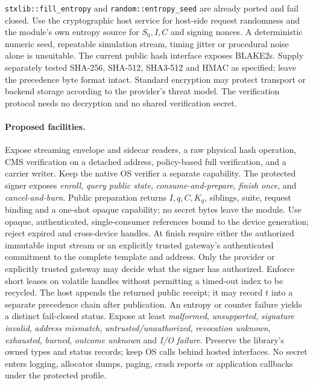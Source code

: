 \documentclass[10pt,twocolumn,letterpaper]{article}
\begin{document}
\texttt{stxlib::fill\_entropy} and \texttt{random::entropy\_seed} are already ported and fail closed. Use the cryptographic host service for host-side request randomness and the module's own entropy source for $S_0,I,C$ and signing nonces. A deterministic numeric seed, repeatable simulation stream, timing jitter or procedural noise alone is unsuitable. The current public hash interface exposes BLAKE2s. Supply separately tested SHA-256, SHA-512, SHA3-512 and HMAC as specified; leave the precedence byte format intact. Standard encryption may protect transport or backend storage according to the provider's threat model. The verification protocol needs no decryption and no shared verification secret.

\paragraph{Proposed facilities.}
Expose streaming envelope and sidecar readers, a raw physical hash operation, CMS verification on a detached address, policy-based full verification, and a carrier writer. Keep the native OS verifier a separate capability. The protected signer exposes \emph{enroll}, \emph{query public state}, \emph{consume-and-prepare}, \emph{finish once}, and \emph{cancel-and-burn}. Public preparation returns $I,q,C,K_q$, siblings, suite, request binding and a one-shot opaque capability; no secret bytes leave the module. Use opaque, authenticated, single-consumer references bound to the device generation; reject expired and cross-device handles. At finish require either the authorized immutable input stream or an explicitly trusted gateway's authenticated commitment to the complete template and address. Only the provider or explicitly trusted gateway may decide what the signer has authorized. Enforce short leases on volatile handles without permitting a timed-out index to be recycled. The host appends the returned public receipt; it may record $t$ into a separate precedence chain after publication. An entropy or counter failure yields a distinct fail-closed status. Expose at least \emph{malformed}, \emph{unsupported}, \emph{signature invalid}, \emph{address mismatch}, \emph{untrusted/unauthorized}, \emph{revocation unknown}, \emph{exhausted}, \emph{burned}, \emph{outcome unknown} and \emph{I/O failure}. Preserve the library's owned types and status records; keep OS calls behind hosted interfaces. No secret enters logging, allocator dumps, paging, crash reports or application callbacks under the protected profile.
\end{document}
